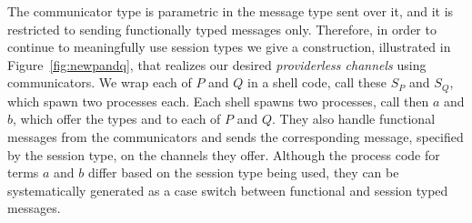 The communicator type is parametric in the message type sent over it, and it is restricted to sending functionally typed messages only. 
Therefore, in order to continue to meaningfully use session types we give a construction, illustrated in Figure~\ref{fig:newpandq}, that realizes our desired \emph{providerless channels} using communicators.
We wrap each of $P$ and $Q$ in a shell code, call these $S_P$ and $S_Q$, which spawn two processes each.
Each shell spawns two processes, call then $a$ and $b$, which offer the types  and  to each of $P$ and $Q$. They also handle functional messages from the communicators and sends the corresponding message, specified by the session type, on the channels they offer. %
Although the process code for terms $a$ and $b$ differ based on the session type being used, they can be systematically generated as a case switch between functional and session typed messages.
